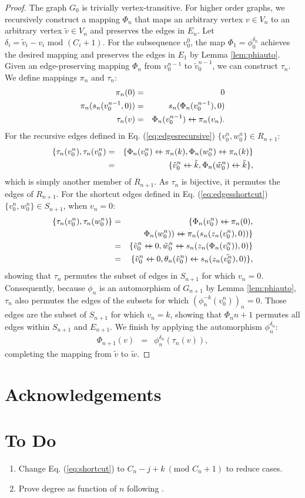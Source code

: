 \documentclass[twocolumn]{article}
\newcommand{\beq}{\begin{eqnarray}}
\newcommand{\eeq}{\end{eqnarray}}
\newcommand{\append}{\leftarrow{\mkern-18mu}{+}\:}
\begin{document}
\begin{proof}
The graph $G_0$ is trivially vertex-transitive.
For higher order graphs,
we recursively construct a mapping $\Phi_n$
that maps an arbitrary vertex $v \in V_n$ to
an arbitrary vertex $\tilde{v} \in V_n$ and preserves the edges in $E_n$.
Let $\delta_i = \tilde{v}_i - v_i \mbox{ mod } (C_i + 1)$.
For the subsequence $v_0^0$, the map $\Phi_1 = \phi_0^{\delta_0}$
achieves the desired mapping and preserves the edges in $E_1$ by
Lemma \ref{lem:phiauto}.
Given an edge-preserving mapping $\Phi_n$
from $v_0^{n-1}$ to $\tilde{v}_0^{n-1}$,
we can construct $\tau_{n}$.
We define mappings $\pi_n$ and $\tau_{n}$:
\beq
\pi_n(0) &=& 0
\\
\pi_n(s_n(v_0^{n-1}, 0))
&=& s_n(\Phi_n(v_0^{n-1}), 0)
\\
\tau_{n}(v)
&=& \Phi_{n}(v_0^{n-1}) \append \pi_n(v_n).
\eeq
For the recursive edges defined in Eq. (\ref{eq:edgesrecursive})
$\{v_0^n, w_0^n\} \in R_{n+1}$:
\beq
\{ \tau_{n}(v_0^n), \tau_{n}(v_0^n)
&=&
\{ \Phi_n(v_0^n) \append \pi_n(k), \Phi_n(w_0^n) \append \pi_n(k)\}
\\ &=&
\{ \tilde{v}_0^n \append \tilde{k}, \Phi_n(\tilde{w}_0^n) \append \tilde{k}\},
\eeq
which is simply another member of $R_{n+1}$.
As $\tau_{n}$ is bijective, it permutes the edges of $R_{n+1}$.
For the shortcut edges defined in Eq. (\ref{eq:edgesshortcut})
$\{v_0^n, w_0^n\} \in S_{n+1}$, when $v_n=0$:
\beq
\{\tau_{n}(v_0^n), \tau_{n}(w_0^n)\}
&=&
\{ \Phi_n(v_0^n) \append \pi_n(0),
\\ &&
\quad \Phi_n(w_0^n)) \append \pi_n(s_n(z_n(v_0^n), 0)) \}
\\ &=&
\{ \tilde{v}_0^n \append 0,
\tilde{w}_0^n \append s_n(z_n(\Phi_n(v_0^n)), 0) \}
\\ &=&
\{ \tilde{v}_0^n \append 0,
\theta_n(\tilde{v}_0^n) \append s_n(z_n(\tilde{v_0^n}), 0) \},
\eeq
showing that $\tau_{n}$ permutes the subset of edges in $S_{n+1}$ for which
$v_n=0$.
Consequently, because $\phi_n$ is an automorphism of $G_{n+1}$
by Lemma \ref{lem:phiauto}, $\tau_{n}$ also permutes the edges of the
subsets for which $(\phi_n^{-k}(v_0^n))_n=0$.
Those edges are the subset of $S_{n+1}$ for which $v_n=k$,
showing that $\Phi_n{n+1}$ permutes all edges within $S_{n+1}$ and
$E_{n+1}$.
We finish by applying the automorphism $\phi_n^{\delta_n}$:
\beq
\Phi_{n+1}(v) &=& \phi_n^{\delta_n}(\tau_{n}(v)),
\eeq
completing the mapping from $\tilde{v}$ to $\tilde{w}$.
\end{proof}
\section{Acknowledgements}
\section{To Do}
\begin{enumerate}
\item{Change Eq. (\ref{eq:shortcut}) to $C_n - j + k \ (\mbox{mod } C_n + 1)$ to reduce cases.}
\item{Prove degree as function of $n$ following \cite{aho1973}.}
\end{enumerate}


\end{document}

